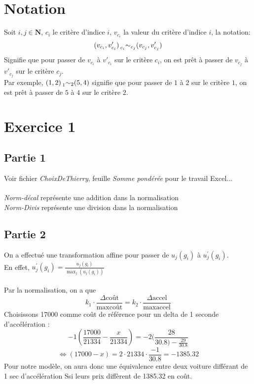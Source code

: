 \documentclass[a4paper, 12pt]{article}
\newcommand*{\indif}[4]{#1 \prescript{}{#2}{\sim}_{#3} #4}
\begin{document}
	\section*{Notation}
	Soit $i,j \in \mathbf{N}$, $c_i$ le critère d'indice $i$, $v_{c_i}$ la valeur du critère d'indice $i$,
	la notation:
	$$\indif{(v_{c_i},v'_{c_i})}{c_i}{c_j}{(v_{c_j},v'_{c_j})}$$
	Signifie que pour passer de $v_{c_i}$ à $v'_{c_i}$ sur le critère $c_i$, on est prêt à passer de
	$v_{c_j}$ à $v'_{c_j}$ sur le critère $c_j$.\\
	
	Par exemple, $\indif{(1,2)}{1}{2}{(5,4)}$ signifie que pour passer de $1$ à $2$ sur
	le critère $1$, on est prêt à passer de $5$ à $4$ sur le critère $2$.
	\section*{Exercice 1}
		\subsection*{Partie 1}
			Voir fichier \textit{ChoixDeThierry}, feuille 
			\textit{Somme pondérée} pour le travail Excel...\\
			~\\
			\textit{Norm-décal} représente une addition dans la
			 normalisation\\
			\textit{Norm-Divis} représente une division dans la 
			 normalisation
		\subsection*{Partie 2}
			On a effectué une transformation affine pour passer de
			$u_j(g_i)$ à $u^{'}_{j}(g_i)$. \\
			En effet,  $u^{'}_{j}(g_i) = 
			\frac{u_j(g_i)}{\max_j (u_j(g_i))}$\\
			~\\
			Par la normalisation, on a que 
			$$ k_1 \cdot \frac{\Delta \text{coût}}{\max \text{coût}} 
			 = k_2 \cdot \frac{\Delta \text{accel}}{\max \text{accel}}$$
			Choisissons 17000 comme coût de référence pour un delta de 1
			seconde d'accélération : 
			$$ -1 (\frac{17000}{21334} - \frac{x}{21334})
			 = -2 (\frac{28}{30.8) - \frac{29}{30.8}} $$
			$$ \Leftrightarrow 
			   (17000 - x) = 2 \cdot 21334 \cdot \frac{-1}{30.8} 
			 = -1385.32 $$
			Pour notre modèle, on aura donc une équivalence entre deux
			voiture différant de 1 sec d'accélération Ssi leurs prix 
			diffèrent de 1385.32 en coût.
\end{document}
